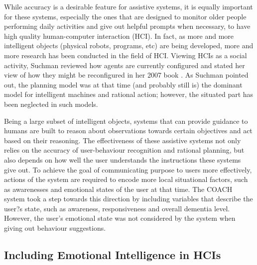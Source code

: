 While accuracy is a desirable feature for assistive systems, it is equally important for these systems, especially the ones that are designed to monitor older people performing daily activities and give out helpful prompts when necessary, to have high quality human-computer interaction (HCI). In fact, as more and more intelligent objects (physical robots, programs, etc) are being developed, more and more research has been conducted in the field of HCI. Viewing HCIs as a social activity, Suchman reviewed how agents are currently configured and stated her view of how they might be reconfigured in her 2007 book \cite{suchman2007human}. As Suchman pointed out, the planning model was at that time (and probably still is) the dominant model for intelligent machines and rational action; however, the situated part has been neglected in such models.

Being a large subset of intelligent objects, systems that can provide guidance to humans are built to reason about observations towards certain objectives and act based on their reasoning. The effectiveness of these assistive systems not only relies on the accuracy of user-behaviour recognition and rational planning, but also depends on how well the user understands the instructions these systems give out. To achieve the goal of communicating purpose to users more effectively, actions of the system are required to encode more local situational factors, such as awarenesses and emotional states of the user at that time. The COACH system \cite{hoey2010automated} took a step towards this direction by including variables that describe the user?s state, such as awareness, responsiveness and overall dementia level. However, the user's emotional state was not considered by the system when giving out behaviour suggestions.

\subsection{Including Emotional Intelligence in HCIs}

